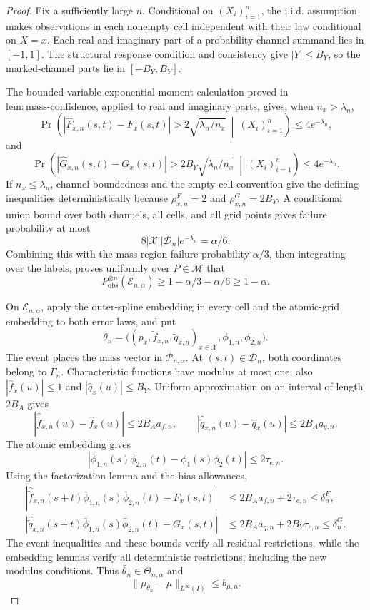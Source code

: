 \documentclass{article}
\begin{document}
\begin{proof}
Fix a sufficiently large \(n\). Conditional on \((X_i)_{i=1}^n\), the i.i.d. assumption makes observations in each nonempty cell independent with their law conditional on \(X=x\). Each real and imaginary part of a probability-channel summand lies in \([-1,1]\). The structural response condition and consistency give \(|Y|\le B_Y\), so the marked-channel parts lie in \([-B_Y,B_Y]\).

The bounded-variable exponential-moment calculation proved in \(\mathrm{lem{:}mass\text{-}confidence}\), applied to real and imaginary parts, gives, when \(n_x>\lambda_n\),
\[
 \Pr\left(
 |\widehat F_{x,n}(s,t)-F_x(s,t)|>2\sqrt{\lambda_n/n_x}
 \ \middle|\ (X_i)_{i=1}^n\right)\le4e^{-\lambda_n},
\]
and
\[
 \Pr\left(
 |\widehat G_{x,n}(s,t)-G_x(s,t)|>2B_Y\sqrt{\lambda_n/n_x}
 \ \middle|\ (X_i)_{i=1}^n\right)\le4e^{-\lambda_n}.
\]
If \(n_x\le\lambda_n\), channel boundedness and the empty-cell convention give the defining inequalities deterministically because \(\rho^F_{x,n}=2\) and \(\rho^G_{x,n}=2B_Y\). A conditional union bound over both channels, all cells, and all grid points gives failure probability at most
\[
 8|\mathcal X||\mathcal D_n|e^{-\lambda_n}=\alpha/6.
\]
Combining this with the mass-region failure probability \(\alpha/3\), then integrating over the labels, proves uniformly over \(P\in\mathcal M\) that
\[
 P_{\mathrm{obs}}^{\otimes n}(\mathcal E_{n,\alpha})
 \ge1-\alpha/3-\alpha/6\ge1-\alpha.
\]

On \(\mathcal E_{n,\alpha}\), apply the outer-spline embedding in every cell and the atomic-grid embedding to both error laws, and put
\[
 \bar\theta_n=
 \bigl((p_x,\widetilde f_{x,n},\widetilde q_{x,n})_{x\in\mathcal X},
       \bar\phi_{1,n},\bar\phi_{2,n}\bigr).
\]
The event places the mass vector in \(\mathcal P_{n,\alpha}\). At \((s,t)\in\mathcal D_n\), both coordinates belong to \(\Gamma_n\). Characteristic functions have modulus at most one; also \(|\widehat f_x(u)|\le1\) and \(|\widehat q_x(u)|\le B_Y\). Uniform approximation on an interval of length \(2B_A\) gives
\[
 |\widehat{\widetilde f}_{x,n}(u)-\widehat f_x(u)|\le2B_Aa_{f,n},
 \qquad
 |\widehat{\widetilde q}_{x,n}(u)-\widehat q_x(u)|\le2B_Aa_{q,n}.
\]
The atomic embedding gives
\[
 |\bar\phi_{1,n}(s)\bar\phi_{2,n}(t)-\phi_1(s)\phi_2(t)|
 \le2\tau_{e,n}.
\]
Using the factorization lemma and the bias allowances,
\[
 \begin{aligned}
 |\widehat{\widetilde f}_{x,n}(s+t)
   \bar\phi_{1,n}(s)\bar\phi_{2,n}(t)-F_x(s,t)|
 &\le2B_Aa_{f,n}+2\tau_{e,n}\le\delta^F_n,\\
 |\widehat{\widetilde q}_{x,n}(s+t)
   \bar\phi_{1,n}(s)\bar\phi_{2,n}(t)-G_x(s,t)|
 &\le2B_Aa_{q,n}+2B_Y\tau_{e,n}\le\delta^G_n.
 \end{aligned}
\]
The event inequalities and these bounds verify all residual restrictions, while the embedding lemmas verify all deterministic restrictions, including the new modulus conditions. Thus \(\bar\theta_n\in\Theta_{n,\alpha}\) and
\[
 \|\mu_{\bar\theta_n}-\mu\|_{L^\infty(I)}\le b_{\mu,n}.
\]


\end{proof}
\end{document}
